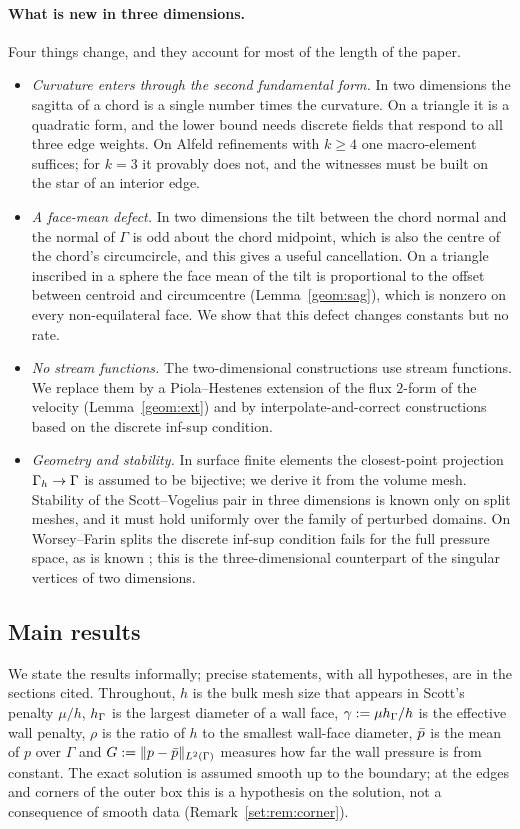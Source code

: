 \paragraph{What is new in three dimensions.} Four things change, and they account for most of the length of the paper.
\begin{itemize}
\item \emph{Curvature enters through the second fundamental form.} In two dimensions the sagitta of a chord is a single number times the curvature. On a triangle it is a quadratic form, and the lower bound needs discrete fields that respond to all three edge weights. On Alfeld refinements with $k\ge4$ one macro-element suffices; for $k=3$ it provably does not, and the witnesses must be built on the star of an interior edge.
\item \emph{A face-mean defect.} In two dimensions the tilt between the chord normal and the normal of $\Gamma$ is odd about the chord midpoint, which is also the centre of the chord's circumcircle, and this gives a useful cancellation. On a triangle inscribed in a sphere the face mean of the tilt is proportional to the offset between centroid and circumcentre (Lemma~\ref{geom:sag}), which is nonzero on every non-equilateral face. We show that this defect changes constants but no rate.
\item \emph{No stream functions.} The two-dimensional constructions use stream functions. We replace them by a Piola--Hestenes extension of the flux $2$-form of the velocity (Lemma~\ref{geom:ext}) and by interpolate-and-correct constructions based on the discrete inf-sup condition.
\item \emph{Geometry and stability.} In surface finite elements the closest-point projection $\Gamma_h\to\Gamma$ is assumed to be bijective; we derive it from the volume mesh. Stability of the Scott--Vogelius pair in three dimensions is known only on split meshes, and it must hold uniformly over the family of perturbed domains. On Worsey--Farin splits the discrete inf-sup condition fails for the full pressure space, as is known \cite{GuzmanLischkeNeilan2022,FabienGuzmanNeilanZytoon2022}; this is the three-dimensional counterpart of the singular vertices of two dimensions.
\end{itemize}

\subsection{Main results}
We state the results informally; precise statements, with all hypotheses, are in the sections cited. Throughout, $h$ is the bulk mesh size that appears in Scott's penalty $\mu/h$, $h_\Gamma$ is the largest diameter of a wall face, $\gamma:=\mu h_\Gamma/h$ is the effective wall penalty, $\rho$ is the ratio of $h$ to the smallest wall-face diameter, $\bar p$ is the mean of $p$ over $\Gamma$ and $G:=\lVert p-\bar p\rVert_{L^2(\Gamma)}$ measures how far the wall pressure is from constant. The exact solution is assumed smooth up to the boundary; at the edges and corners of the outer box this is a hypothesis on the solution, not a consequence of smooth data (Remark~\ref{set:rem:corner}).

